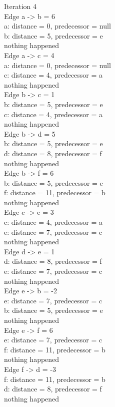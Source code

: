\noindent Iteration 4\\
Edge a -> b = 6\\
a: distance = 0, predecessor = null\\
b: distance = 5, predecessor = e\\
nothing happened\\
Edge a -> c = 4\\
a: distance = 0, predecessor = null\\
c: distance = 4, predecessor = a\\
nothing happened\\
Edge b -> c = 1\\
b: distance = 5, predecessor = e\\
c: distance = 4, predecessor = a\\
nothing happened\\
Edge b -> d = 5\\
b: distance = 5, predecessor = e\\
d: distance = 8, predecessor = f\\
nothing happened\\
Edge b -> f = 6\\
b: distance = 5, predecessor = e\\
f: distance = 11, predecessor = b\\
nothing happened\\
Edge c -> e = 3\\
c: distance = 4, predecessor = a\\
e: distance = 7, predecessor = c\\
nothing happened\\
Edge d -> e = 1\\
d: distance = 8, predecessor = f\\
e: distance = 7, predecessor = c\\
nothing happened\\
Edge e -> b = -2\\
e: distance = 7, predecessor = c\\
b: distance = 5, predecessor = e\\
nothing happened\\
Edge e -> f = 6\\
e: distance = 7, predecessor = c\\
f: distance = 11, predecessor = b\\
nothing happened\\
Edge f -> d = -3\\
f: distance = 11, predecessor = b\\
d: distance = 8, predecessor = f\\
nothing happened\\

